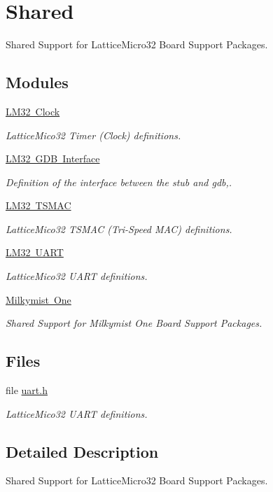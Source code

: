 \hypertarget{group__RTEMSBSPsLM32Shared}{}\section{Shared}
\label{group__RTEMSBSPsLM32Shared}


Shared Support for Lattice\+Micro32 Board Support Packages.  


\subsection*{Modules}
\begin{DoxyCompactItemize}
\item 
\mbox{\hyperlink{group__lm32__clock}{L\+M32 Clock}}
\begin{DoxyCompactList}\small\item\em Lattice\+Mico32 Timer (Clock) definitions. \end{DoxyCompactList}\item 
\mbox{\hyperlink{group__lm32__gdb}{L\+M32 G\+D\+B Interface}}
\begin{DoxyCompactList}\small\item\em Definition of the interface between the stub and gdb,. \end{DoxyCompactList}\item 
\mbox{\hyperlink{group__lm32__tsmac}{L\+M32 T\+S\+M\+AC}}
\begin{DoxyCompactList}\small\item\em Lattice\+Mico32 T\+S\+M\+AC (Tri-\/\+Speed M\+AC) definitions. \end{DoxyCompactList}\item 
\mbox{\hyperlink{group__lm32__uart}{L\+M32 U\+A\+RT}}
\begin{DoxyCompactList}\small\item\em Lattice\+Mico32 U\+A\+RT definitions. \end{DoxyCompactList}\item 
\mbox{\hyperlink{group__RTEMSBSPsLM32SharedMilkymistOne}{Milkymist One}}
\begin{DoxyCompactList}\small\item\em Shared Support for Milkymist One Board Support Packages. \end{DoxyCompactList}\end{DoxyCompactItemize}
\subsection*{Files}
\begin{DoxyCompactItemize}
\item 
file \mbox{\hyperlink{lm32_2shared_2console_2uart_8h}{uart.\+h}}
\begin{DoxyCompactList}\small\item\em Lattice\+Mico32 U\+A\+RT definitions. \end{DoxyCompactList}\end{DoxyCompactItemize}


\subsection{Detailed Description}
Shared Support for Lattice\+Micro32 Board Support Packages. 

